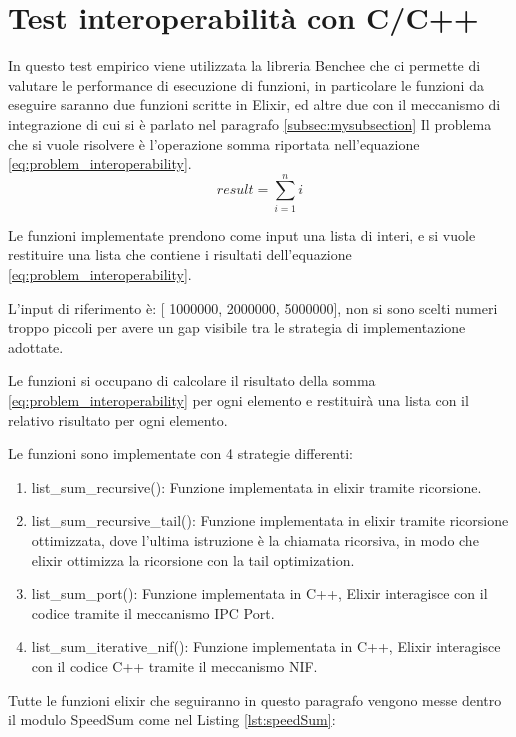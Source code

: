\section{Test interoperabilità con C/C++}

\renewcommand\lstlistingname{Listing}

In questo test empirico viene utilizzata la libreria Benchee
che ci permette di valutare le performance di esecuzione di
funzioni, in particolare le funzioni da eseguire saranno due funzioni
scritte in Elixir, ed altre due con il meccanismo di integrazione
di cui si è parlato nel paragrafo \ref{subsec:mysubsection}
Il problema che si vuole risolvere è l'operazione somma
riportata nell'equazione \ref{eq:problem_interoperability}.
\begin{equation}
	result = \sum_{i=1}^{n}i \label{eq:problem_interoperability}
\end{equation}

Le funzioni implementate prendono come input una lista
di interi, e si vuole restituire una lista che contiene
i risultati dell'equazione \ref{eq:problem_interoperability}.

L'input di riferimento è: [ 1000000, 2000000, 5000000], non si
sono scelti numeri troppo piccoli per avere un gap visibile
tra le strategia di implementazione adottate.

Le funzioni si occupano di calcolare il risultato della somma
\ref{eq:problem_interoperability} per ogni elemento e
restituirà una lista con il relativo risultato per ogni elemento.

Le funzioni sono implementate con 4 strategie differenti:
\begin{enumerate}
	\item list\_sum\_recursive(): Funzione implementata in elixir
	tramite ricorsione.
	\item list\_sum\_recursive\_tail(): Funzione implementata in elixir
	tramite ricorsione ottimizzata, dove l'ultima istruzione è la
	chiamata ricorsiva, in modo che elixir ottimizza la ricorsione
	con la tail optimization.
	\item list\_sum\_port(): Funzione implementata in C++, Elixir interagisce
	con il codice tramite il meccanismo IPC Port.
	\item list\_sum\_iterative\_nif(): Funzione implementata in C++, Elixir
	interagisce con il codice C++ tramite il meccanismo NIF.
\end{enumerate}

Tutte le funzioni elixir che seguiranno in questo paragrafo
vengono messe dentro il modulo SpeedSum
come nel Listing \ref{lst:speedSum}:

